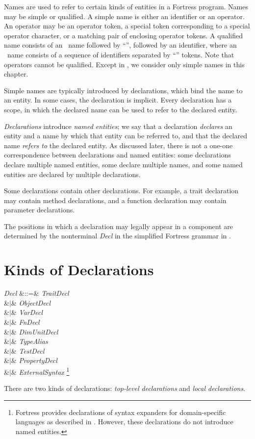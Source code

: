Names are used to refer to certain kinds of entities
in a Fortress program.
Names may be simple or qualified.
A simple name is either an identifier or an operator.
An operator may be an operator token,
a special token corresponding to a special operator character,
or a matching pair of enclosing operator tokens.
A qualified name consists of an \apiN\ name
followed by ``'',
followed by an identifier,
where an \apiN\ name consists of a sequence of identifiers
separated by ``'' tokens.
Note that operators cannot be qualified.
Except in ,
we consider only simple names in this chapter.

Simple names are typically introduced by declarations,
which bind the name to an entity.
In some cases,
the declaration is implicit.
Every declaration has a scope,
in which the declared name can be used to refer to the declared entity.

\emph{Declarations} introduce \emph{named entities};
we say that a declaration \emph{declares} an entity
and a name by which that entity can be referred to,
and that the declared name \emph{refers to} the declared entity.
As discussed later, there is not a one-one correspondence
between declarations and named entities:
some declarations declare multiple named entities,
some declare multiple names,
and some named entities are declared by multiple declarations.

Some declarations contain other declarations.
For example, a trait declaration may contain method declarations,
and a function declaration may contain parameter declarations.

The positions in which a declaration may legally
appear in a component are determined by the nonterminal \emph{Decl}
in the simplified Fortress grammar in .


\section{Kinds of Declarations}


\begin{Grammar}
\emph{Decl} &::=& \emph{TraitDecl}\\
&$|$& \emph{ObjectDecl}\\
&$|$& \emph{VarDecl}\\
&$|$& \emph{FnDecl}\\
&$|$& \emph{DimUnitDecl}\\
&$|$& \emph{TypeAlias}\\
&$|$& \emph{TestDecl}\\
&$|$& \emph{PropertyDecl}\\
&$|$& \emph{ExternalSyntax}
\footnote{
Fortress provides declarations of syntax expanders for domain-specific languages
as described in .
 However, these declarations do not introduce named entities.
}\\
\end{Grammar}
There are two kinds of declarations: \emph{top-level declarations} and
\emph{local declarations}.

